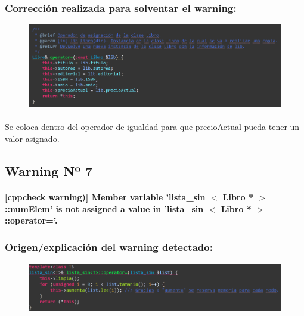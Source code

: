 		\subsubsection{Corrección realizada para solventar el warning:}
		
			\begin{figure}[H]
				\centering
				\includegraphics[scale=0.55]{img/esteban5.png}
				\label{esteban5}
			\end{figure}
		
			\paragraph{}Se coloca dentro del operador de igualdad para que precioActual pueda tener un valor asignado.
			
	\subsection{Warning Nº 7}
	
		\paragraph{[cppcheck warning)] Member variable 'lista\_sin $<$ Libro * $>$::numElem' is not assigned a value in 'lista\_sin $<$ Libro * $>$::operator='.}
		
		\subsubsection{Origen/explicación del warning detectado:}
		
			\begin{figure}[H]
				\centering
				\includegraphics[scale=0.55]{img/esteban6.png}
				\label{esteban6}
			\end{figure}
		
